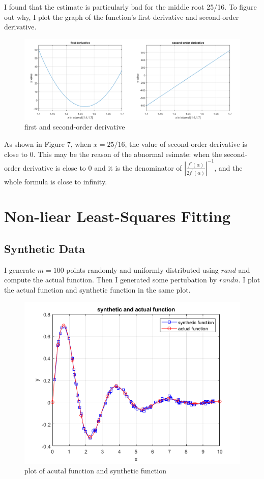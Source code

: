 \documentclass[a4paper]{article}
\begin{document}
I found that the estimate is particularly bad for the middle root 25/16. To figure out why, I plot the graph of the function's first derivative and second-order derivative.

\begin{figure}[H] 
\centering 
\includegraphics[width=1.0\textwidth]{1.3-5.png}
\caption{first and second-order derivative} 
\label{Fig.1.3-5} 
\end{figure}

As shown in Figure 7, when $x=25/16$, the value of second-order derivative is close to 0. This may be the reason of the abnormal esimate: when the second-order derivative is close to 0 and it is the denominator of  $\left| \frac{f^{''}(\alpha)}{2f^{'}(\alpha)} \right|^{-1}$, and the whole formula is close to infinity.

\section{Non-liear Least-Squares Fitting}

\subsection{Synthetic Data}
I generate $m=100$ points randomly and uniformly distributed using $rand$ and compute the actual function. Then I generated some pertubation by $randn$. I plot the actual function and synthetic function in the same plot. 

\begin{figure}[H] 
\centering 
\includegraphics[width=1.0\textwidth]{2.1-1.png}
\caption{plot of acutal function and synthetic function} 
\label{Fig.2.1-1} 
\end{figure}
\end{document}
